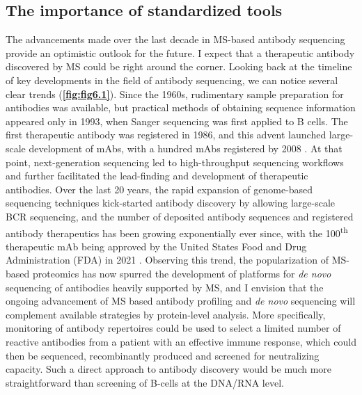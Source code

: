 \subsection{The importance of standardized tools}
The advancements made over the last decade in MS-based antibody sequencing provide an optimistic outlook for the future. I expect that a therapeutic antibody discovered by MS could be right around the corner. Looking back at the timeline of key developments in the field of antibody sequencing, we can notice several clear trends (\textbf{\autoref{fig:fig6.1}}). Since the 1960s, rudimentary sample preparation for antibodies was available, but practical methods of obtaining sequence information appeared only in 1993, when Sanger sequencing was first applied to B cells. The first therapeutic antibody was registered in 1986, and this advent launched large-scale development of mAbs, with a hundred mAbs registered by 2008 \cite{raybould2020thera-sabdab:}. At that point, next-generation sequencing led to high-throughput sequencing workflows and further facilitated the lead-finding and development of therapeutic antibodies. Over the last 20 years, the rapid expansion of genome-based sequencing techniques kick-started antibody discovery by allowing large-scale BCR sequencing, and the number of deposited antibody sequences and registered antibody therapeutics has been growing exponentially ever since, with the 100\textsuperscript{th} therapeutic mAb being approved by the United States Food and Drug Administration (FDA) in 2021 \cite{mullard2021fda}. Observing this trend, the popularization of MS-based proteomics has now spurred the development of platforms for \emph{de novo} sequencing of antibodies heavily supported by MS, and I envision that the ongoing advancement of MS based antibody profiling and \emph{de novo} sequencing will complement available strategies by protein-level analysis. More specifically, monitoring of antibody repertoires could be used to select a limited number of reactive antibodies from a patient with an effective immune response, which could then be sequenced, recombinantly produced and screened for neutralizing capacity. Such a direct approach to antibody discovery would be much more straightforward than screening of B-cells at the DNA/RNA level.
